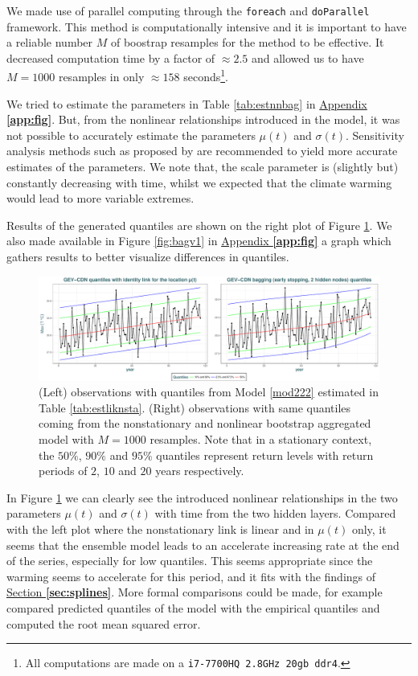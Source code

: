  We made use of parallel computing through the \texttt{foreach} and \texttt{doParallel} framework. This method is computationally intensive and it is important to have a reliable number $M$ of boostrap resamples for the method to be effective. It decreased computation time by a factor of $\approx 2.5$ and allowed us to have $M=1000$ resamples in only $\approx 158$ seconds\footnote{All computations are made on a \texttt{i7-7700HQ 2.8GHz 20gb ddr4}.}.
 
 We tried to estimate the parameters in Table \ref{tab:estnnbag} in \hyperref[app:fig]{Appendix \textbf{\ref{app:fig}}}.
 But, from the nonlinear relationships introduced in the model, it was not possible to accurately estimate the parameters $\mu(t)$ and $\sigma(t)$. Sensitivity analysis methods such as proposed by \citet{cannon_graph_2002} are recommended to yield more accurate estimates of the parameters.
 We note that, the scale parameter is (slightly but) constantly decreasing with time, whilst we expected that the climate warming would lead to more variable extremes.
 
 Results of the generated quantiles are shown on the right plot of Figure \ref{fig:bag}. We also made available in Figure \ref{fig:bagv1} in  \hyperref[app:fig]{Appendix \textbf{\ref{app:fig}}} a graph which gathers results to better visualize differences in quantiles. 
 
 \begin{figure}[!htb]
 	\centering	\includegraphics[width=1\linewidth]{gev_compv0.pdf}\caption{(Left) observations with quantiles from Model \ref{mod222} estimated in Table \ref{tab:estliknsta}. (Right) observations with same quantiles coming from the nonstationary and nonlinear bootstrap aggregated model with $M=1000$ resamples.
 	Note that in a stationary context, the $50\%$, $90\%$ and $95\%$ quantiles represent return levels with return periods of $2$, $10$ and $20$ years respectively.}\label{fig:bag}
 \end{figure}
 
In Figure \ref{fig:bag} we can clearly see the introduced nonlinear relationships in the two parameters $\mu(t)$ and $\sigma(t)$ with time from the two hidden layers. Compared with the left plot where the nonstationary link is linear and in $\mu(t)$ only, it seems that the ensemble model leads to an accelerate increasing rate at the end of the series, especially for low quantiles. This seems appropriate since the warming seems to accelerate for this period, and it fits with the findings of   \hyperref[sec:splines]{Section \textbf{\ref{sec:splines}}}. More formal comparisons could be made, for example \citet{cannon_flexible_2010} compared predicted quantiles  of the model with the empirical quantiles and computed the root mean squared error.


